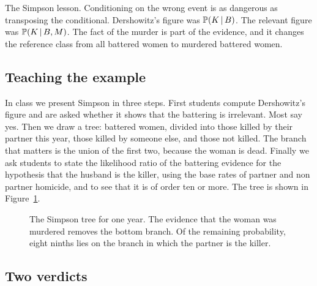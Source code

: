\begin{keybox}
The Simpson lesson. Conditioning on the wrong event is as dangerous as transposing the conditional. Dershowitz's figure was $\mathbb{P}(K\,\vert\, B)$. The relevant figure was $\mathbb{P}(K\,\vert\, B, M)$. The fact of the murder is part of the evidence, and it changes the reference class from all battered women to murdered battered women.
\end{keybox}

\subsection{Teaching the example}

In class we present Simpson in three steps. First students compute Dershowitz's figure and are asked whether it shows that the battering is irrelevant. Most say yes. Then we draw a tree: battered women, divided into those killed by their partner this year, those killed by someone else, and those not killed. The branch that matters is the union of the first two, because the woman is dead. Finally we ask students to state the likelihood ratio of the battering evidence for the hypothesis that the husband is the killer, using the base rates of partner and non partner homicide, and to see that it is of order ten or more. The tree is shown in Figure~\ref{fig:simpsontree}.

\begin{figure}[t]
\centering
{}
\caption{The Simpson tree for one year. The evidence that the woman was murdered removes the bottom branch. Of the remaining probability, eight ninths lies on the branch in which the partner is the killer.}
\label{fig:simpsontree}
\end{figure}

\subsection{Two verdicts}

